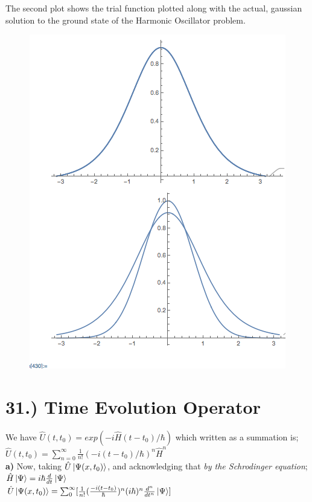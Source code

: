 \documentclass[12pt]{article}
\begin{document}
The second plot shows the trial function plotted along with the actual, gaussian solution to the ground state of the Harmonic Oscillator problem.

\begin{figure}[h!]
    \centering
    \includegraphics[width=0.8\linewidth]{111.png}
\end{figure}

\section*{31.) Time Evolution Operator}

We have $\hat{U}(t,t_0)=exp(-i\hat{H}(t-t_0)/\hbar)$ which written as a summation is;\\

$\hat{U}(t,t_0)={\sum_{n=0}^\infty}\frac{1}{n!}(-i(t-t_0)/\hbar)^n\hat{H}^n$\\

\textbf{a)} Now, taking $\hat{U}\ket{\Psi(x,t_0)}$, and acknowledging that \textit{by the Schrodinger equation}; $\hat{H}\ket{\Psi}=i\hbar\frac{d}{dt}\ket{\Psi}$\\

$\hat{U}\ket{\Psi(x,t_0)}=\sum_{0}^\infty[\frac{1}{n!}(\frac{-i(t-t_0)}{\hbar})^n(i\hbar)^n\frac{d^n}{dt^n}\ket{\Psi}]$\\
\end{document}
